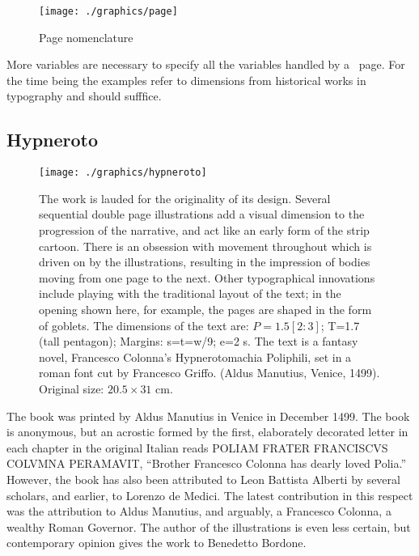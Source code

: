 \begin{figure}
  \texttt{[image: ./graphics/page]}
  \caption{Page nomenclature}
   \label{fig:marginfig1}
\end{figure}

More variables are necessary to specify all the variables handled by a \latex\
page. For the time being the examples refer to dimensions from historical works
in typography and should sufffice.

\subsection{Hypneroto}

\begin{figure}[htbp]
  \texttt{[image: ./graphics/hypneroto]}
\caption{The work is lauded for the originality of its
design. Several sequential double page
illustrations add a visual dimension to the
progression of the narrative, and act like an
early form of the strip cartoon. There is an
obsession with movement throughout which is driven
on by the illustrations, resulting in the
impression of bodies moving from one page to the
next. Other typographical innovations include
playing with the traditional layout of the text;
in the opening shown here, for example, the pages
are shaped in the form of goblets. The dimensions
of the text are: $P=1.5[2:3]$; T=1.7 (tall pentagon);
Margins: s=t=w/9; e=2 s. The text is a fantasy
novel, Francesco Colonna's Hypnerotomachia
Poliphili, set in a roman font cut by Francesco
Griffo. (Aldus Manutius, Venice, 1499). Original
size: $20.5 \times 31$ cm.}
\label{fig:hypneroto}
\end{figure}








The book was printed by Aldus Manutius in Venice in December 1499. The book is anonymous, but an acrostic formed by the first, elaborately decorated letter in each chapter in the original Italian reads \textsc{\small POLIAM FRATER FRANCISCVS COLVMNA PERAMAVIT}, \enquote{Brother Francesco Colonna has dearly loved Polia.} However, the book has also been attributed to Leon Battista Alberti by several scholars, and earlier, to Lorenzo de Medici. The latest contribution in this respect was the attribution to Aldus Manutius, and arguably, a Francesco Colonna, a wealthy Roman Governor. The author of the illustrations is even less certain, but contemporary opinion gives the work to Benedetto Bordone.




